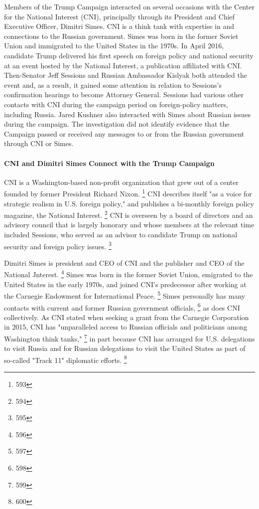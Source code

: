 Members of the Trump Campaign interacted on several occasions with the Center for the National Interest (CNI), principally through its President and Chief Executive Officer, Dimitri Simes.
CNI is a think tank with expertise in and connections to the Russian government.
Simes was born in the former Soviet Union and immigrated to the United States in the 1970s.
In April 2016, candidate Trump delivered his first speech on foreign policy and national security at an event hosted by the National Interest, a publication affiliated with CNI.
Then-Senator Jeff Sessions and Russian Ambassador Kislyak both attended the event and, as a result, it gained some attention in relation to Sessions's confirmation hearings to become Attorney General.
Sessions had various other contacts with CNI during the campaign period on foreign-policy matters, including Russia.
Jared Kushner also interacted with Simes about Russian issues during the campaign.
The investigation did not identify evidence that the Campaign passed or received any messages to or from the Russian government through CNI or Simes.

\paragraph{CNI and Dimitri Simes Connect with the Trump Campaign}

CNI is a Washington-based non-profit organization that grew out of a center founded by former President Richard Nixon.%
\footnote{593}
CNI describes itself "as a voice for strategic realism in U.S. foreign policy," and publishes a bi-monthly foreign policy magazine, the National Interest.%
\footnote{594}
CNI is overseen by a board of directors and an advisory council that is largely honorary and whose members at the relevant time included Sessions, who served as an advisor to candidate Trump on national security and foreign policy issues.%
\footnote{595}

Dimitri Simes is president and CEO of CNI and the publisher and CEO of the National Jnterest.%
\footnote{596}
Simes was born in the former Soviet Union, emigrated to the United States in the early 1970s, and joined CNI's predecessor after working at the Carnegie Endowment for International Peace.%
\footnote{597}
Simes personally has many contacts with current and former Russian government officials,%
\footnote{598}
as does CNI collectively.
As CNI stated when seeking a grant from the Carnegie Corporation in 2015, CNI has "unparalleled access to Russian officials and politicians among Washington think tanks,"%
\footnote{599}
in part because CNI has arranged for U.S. delegations to visit Russia and for Russian delegations to visit the United States as part of so-called "Track 11" diplomatic efforts.%
\footnote{600}

